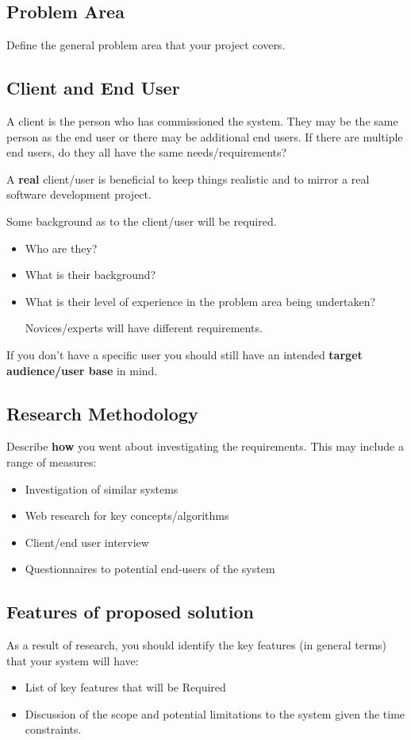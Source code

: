 \documentclass{article}
\begin{document}
\subsection{Problem Area}
Define the general problem area that your project covers.

\subsection{Client and End User}
A client is the person who has commissioned the system. They may be the same person as the end user or there may be additional end users. If there are multiple end users, do they all have the same needs/requirements?

A \textbf{real} client/user is beneficial to keep things realistic and to mirror a real software development project.

Some background as to the client/user will be required.
\begin{itemize}
    \item Who are they?
    \item What is their background?
    \item What is their level of experience in the problem area being undertaken?

          Novices/experts will have different requirements.
\end{itemize}

If you don't have a specific user you should still have an intended \textbf{target audience/user base} in mind.

\subsection{Research Methodology}
Describe \textbf{how} you went about investigating the requirements. This may include a range of measures:
\begin{itemize}
    \item Investigation of similar systems
    \item Web research for key concepts/algorithms
    \item Client/end user interview
    \item Questionnaires to potential end-users of the system
\end{itemize}

\subsection{Features of proposed solution}
As a result of research, you should identify the key features (in general terms) that your system will have:
\begin{itemize}
    \item List of key features that will be Required
    \item Discussion of the scope and potential limitations to the system given the time constraints.
\end{itemize}
\end{document}
